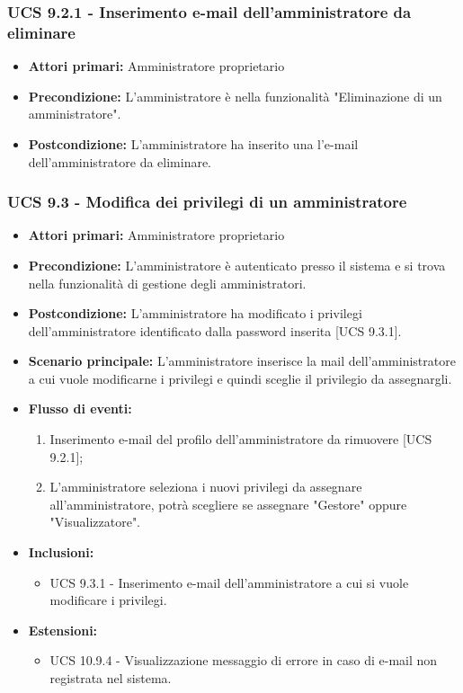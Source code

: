 \subsubsection{UCS 9.2.1 - Inserimento e-mail dell'amministratore da eliminare}%
\begin{itemize}
\item \textbf{Attori primari:} Amministratore proprietario
\item \textbf{Precondizione:} L'amministratore è nella funzionalità "Eliminazione di un amministratore".
\item \textbf{Postcondizione:} L'amministratore ha inserito una l'e-mail dell'amministratore da eliminare.
\end{itemize}

\subsubsection{UCS 9.3 - Modifica dei privilegi di un amministratore}%
\begin{itemize}
\item \textbf{Attori primari:} Amministratore proprietario
\item \textbf{Precondizione:} L'amministratore è autenticato presso il sistema e si trova nella funzionalità di gestione degli amministratori.
\item \textbf{Postcondizione:} L'amministratore ha modificato i privilegi dell'amministratore identificato dalla password inserita [UCS 9.3.1].
\item \textbf{Scenario principale:} L'amministratore inserisce la mail dell'amministratore a cui vuole modificarne i privilegi e quindi sceglie il privilegio da assegnargli.
\item \textbf{Flusso di eventi:} %
  \begin{enumerate}
        \item Inserimento e-mail del profilo dell'amministratore da rimuovere [UCS 9.2.1];
        \item L'amministratore seleziona i nuovi privilegi da assegnare all'amministratore, potrà scegliere se assegnare "Gestore" oppure "Visualizzatore".
    \end{enumerate}
\item \textbf{Inclusioni:}
\begin{itemize}
    \item UCS 9.3.1 - Inserimento e-mail dell'amministratore a cui si vuole modificare i privilegi.
\end{itemize}
\item \textbf{Estensioni:}
	\begin{itemize}
		\item UCS 10.9.4 - Visualizzazione messaggio di errore in caso di e-mail non registrata nel sistema.
	\end{itemize}
\end{itemize}

